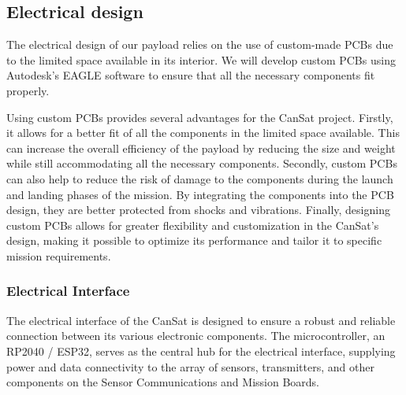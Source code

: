 

\subsection{Electrical design}

The electrical design of our payload relies on the use of custom-made PCBs due to the limited space available in its interior. We will develop custom PCBs using Autodesk's EAGLE software to ensure that all the necessary components fit properly. 

Using custom PCBs provides several advantages for the CanSat project. Firstly, it allows for a better fit of all the components in the limited space available. This can increase the overall efficiency of the payload by reducing the size and weight while still accommodating all the necessary components. Secondly, custom PCBs can also help to reduce the risk of damage to the components during the launch and landing phases of the mission. By integrating the components into the PCB design, they are better protected from shocks and vibrations. Finally, designing custom PCBs allows for greater flexibility and customization in the CanSat's design, making it possible to optimize its performance and tailor it to specific mission requirements.

\subsubsection{Electrical Interface}
The electrical interface of the CanSat is designed to ensure a robust and reliable connection between its various electronic components. The microcontroller, an RP2040 / ESP32, serves as the central hub for the electrical interface, supplying power and data connectivity to the array of sensors, transmitters, and other components on the Sensor Communications and Mission Boards.


